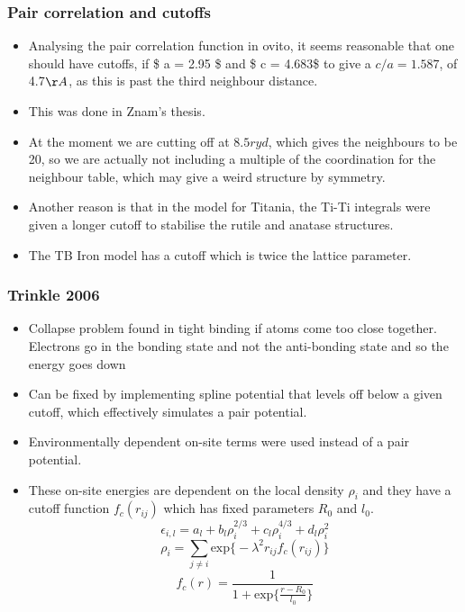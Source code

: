 \documentclass[11pt]{article}
\begin{document}
\subsubsection{Pair correlation and cutoffs}
\label{sec-2-6-1}
\begin{itemize}
\item Analysing the pair correlation function in ovito, it seems reasonable
that one should have cutoffs, if \$ a = 2.95 \$ and \$ c = 4.683\$ to give a
$c/a = 1.587$, of 4.7$\AA$, as this is past the third neighbour
distance.
\item This was done in Znam's thesis.
\item At the moment we are cutting off at $8.5 ryd$, which gives the
neighbours to be 20, so we are actually not including a multiple of the
coordination for the neighbour table, which may give a weird structure
by symmetry.
\item Another reason is that in the model for Titania, the Ti-Ti integrals
were given a longer cutoff to stabilise the rutile and anatase
structures.
\item The TB Iron model has a cutoff which is twice the lattice parameter.
\end{itemize}
\subsubsection{Trinkle 2006}
\label{sec-2-6-2}
\begin{itemize}
\item Collapse problem found in tight binding if atoms come too close
together. Electrons go in the bonding state and not the anti-bonding
state and so the energy goes down
\item Can be fixed by implementing spline potential that levels off below a
given cutoff, which effectively simulates a pair potential.
\item Environmentally dependent on-site terms were used instead of a pair potential.
\item These on-site energies are dependent on the local density $\rho_{i}$ and
they have a cutoff function $f_{c}(r_{ij})$ which has fixed parameters
$R_{0}$ and $l_{0}$.\[
      \epsilon_{i,l} = a_{l} + b_{l}\rho_{i}^{2/3} + c_{l}\rho_{i}^{4/3} +
      d_{l}\rho_{i}^{2}\] 
\[ \rho_{i} = \sum_{j \neq i} \text{exp}\big\{ -\lambda^{2} r_{ij}
      f_{c}(r_{ij}) \big\} \]
\[ f_{c}(r) = \frac{1}{1 + \text{exp}\Big\{  \frac{r-R_{0}}{l_{0}}\Big\}
      }\]
\end{itemize}
\end{document}
